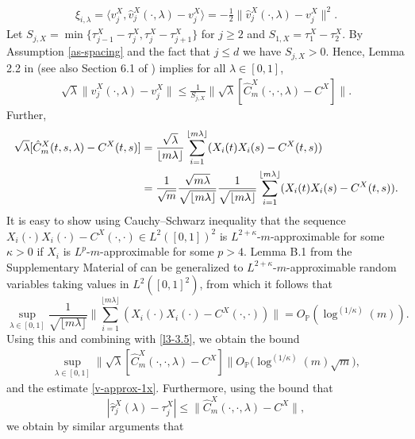 \documentclass[11pt]{article}
\numberwithin{equation}{section}
\numberwithin{theorem}{section}
\numberwithin{lemma}{section}
\numberwithin{proposition}{section}
\numberwithin{cor}{section}
\numberwithin{definition}{section}
\numberwithin{cons}{section}
\numberwithin{rem}{section}
\numberwithin{exa}{section}
\numberwithin{table}{section}
\numberwithin{figure}{section}
\numberwithin{algo}{section}
\begin{document}
{{\begin{align}\label{lem4-5}
\xi_{i,\lambda} = \langle v^X_j, \hat{v}^X_j(\cdot,\lambda) - v^X_j \rangle = -\frac{1}{2} \| \hat{v}^X_j(\cdot,\lambda) - v^X_j\|^2.
\end{align}
Let $S_{j,X} = \min\{  \tau_{j-1}^X- \tau_j^X ,\tau_{j}^X- \tau_{j+1}^X\}$ for $j \geq 2$ and $S_{1,X} = \tau_{1}^X- \tau_2^X $. By    Assumption \ref{as-spacing} and the fact that $j \le d$ we have $S_{j,X} >0$. Hence,  Lemma 2.2 in \cite{horvkoko2012} (see also Section 6.1 of \cite{gohberg1990}) implies for all $\lambda \in [0,1]$,
\begin{align}\label{l3-3.5}
\sqrt{\lambda}\|\hat{v}^X_j(\cdot,\lambda)-v^X_j\| \le \frac{1}{S_{j,X}} \big\| \sqrt{\lambda}[\hat{C}_m^X(\cdot,\cdot,\lambda)- C^X] \big\|.
\end{align}
Further,
\begin{align*}
  \sqrt{\lambda}[\hat{C}_m^X(t,s,\lambda)- C^X(t,s)] &= \frac{\sqrt{\lambda}}{\lfloor m \lambda \rfloor} \sum^{\lfloor m \lambda \rfloor}_{i=1} (X_i(t) X_i(s) - C^X(t, s)) \notag \\
  & = \frac{1}{\sqrt{m}}\frac{\sqrt{m\lambda}}{\sqrt{\lfloor m \lambda \rfloor}} \frac{1}{\sqrt{\lfloor m \lambda \rfloor}}  \sum^{\lfloor m \lambda \rfloor}_{i=1} (X_i(t) X_i(s) - C^X(t, s)).
  \end{align*}
It is easy to show using Cauchy--Schwarz inequality that the sequence $X_i(\cdot) X_i(\cdot) - C^X(\cdot, \cdot) \in L^2([0,1])^2$ is $L^{2+\kappa}$-$m$-approximable for some $\kappa >0$  if $X_i$ is $L^{p}$-$m$-approximable for some $p>4$. Lemma B.1 from the Supplementary Material of  \cite{aue:rice:sonmez:2018} can be  generalized to $L^{2+\kappa}$-$m$-approximable random variables taking values in $L^2([0,1]^2)$, from which it follows that
$$
\sup_{\lambda \in [0,1]}\frac{1}{\sqrt{\lfloor m \lambda \rfloor}}  \Big\| \sum^{\lfloor m \lambda \rfloor}_{i=1} (X_i(\cdot) X_i(\cdot) - C^X(\cdot, \cdot)) \Big\| = O_\mathbb{P}(\log^{(1/\kappa)}(m)).
$$
Using  this and combining with \eqref{l3-3.5}, we obtain the bound
\begin{align}\label{c-approx}
\sup_{\lambda \in [0,1]}\Big\| \sqrt{\lambda}[\hat{C}_m^X(\cdot,\cdot,\lambda)- C^X] \Big\|O_\mathbb{P}\Big({\log^{(1/\kappa)}(m)}{\sqrt{m}} \Big),
\end{align}
and the estimate \eqref{v-approx-1x}. Furthermore, using the bound that
$$
|\hat{\tau}^X_j(\lambda) - \tau^X_j| \le  \big\| \hat{C}_m^X(\cdot,\cdot,\lambda)- C^X \big\|,
$$
we obtain by similar arguments that
\begin{align}\label{eigen-approx-2}

\end{align}}}
\end{document}
